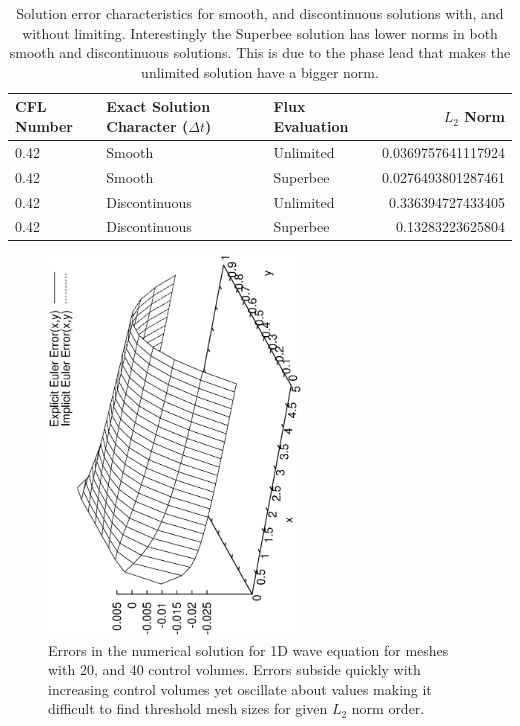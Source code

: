 \documentclass[a4paper,10pt]{article}
\begin{document}
  \begin{table}
      \begin{center}
        \begin{tabular}{|l | l | l | r |}
          \hline
          CFL Number & Exact Solution Character ($\Delta t$) & Flux Evaluation & $L_2$ Norm \\
          \hline
          0.42 & Smooth & Unlimited & 0.0369757641117924 \\
          0.42 & Smooth  & Superbee & 0.0276493801287461 \\
          0.42 & Discontinuous & Unlimited & 0.336394727433405 \\
          0.42 & Discontinuous & Superbee & 0.13283223625804 \\
          \hline
        \end{tabular}
        \caption{Solution error characteristics for smooth, and discontinuous solutions with, and without limiting. Interestingly the Superbee solution has lower norms in both smooth and discontinuous solutions. This is due to the phase lead that makes the unlimited solution have a bigger norm.}
        \label{table:norm2}      
      \end{center}
    \end{table}




\begin{figure}
  \centering
  \includegraphics[width=0.6\textwidth, angle = -90]{../plots/error/Error.eps}
  \caption{Errors in the numerical solution for 1D wave equation for meshes with 20, and 40 control volumes. Errors subside quickly with increasing control volumes yet oscillate about values making it difficult to find threshold mesh sizes for given $L_2$ norm order.}                
  \label{errors}
\end{figure}
\end{document}
